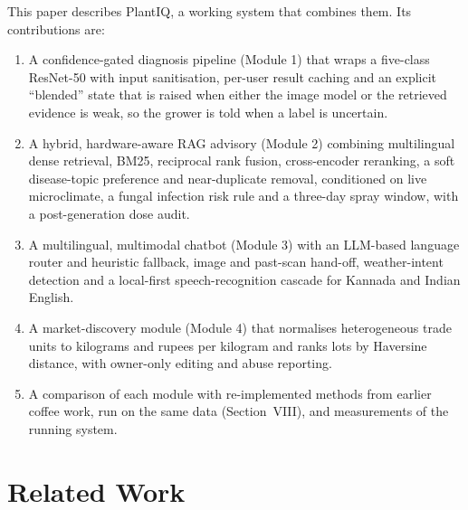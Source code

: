This paper describes PlantIQ, a working system that combines them. Its contributions are:
\begin{enumerate}
\item A confidence-gated diagnosis pipeline (Module 1) that wraps a five-class ResNet-50 with input
sanitisation, per-user result caching and an explicit ``blended'' state that is raised when either the image model or
the retrieved evidence is weak, so the grower is told when a label is uncertain.
\item A hybrid, hardware-aware RAG advisory (Module 2) combining multilingual dense retrieval, BM25, reciprocal
rank fusion, cross-encoder reranking, a soft disease-topic preference and near-duplicate removal, conditioned on live
microclimate, a fungal infection risk rule and a three-day spray window, with a post-generation dose audit.
\item A multilingual, multimodal chatbot (Module 3) with an LLM-based language router and heuristic fallback,
image and past-scan hand-off, weather-intent detection and a local-first speech-recognition cascade for Kannada and
Indian English.
\item A market-discovery module (Module 4) that normalises heterogeneous trade units to kilograms and
rupees per kilogram and ranks lots by Haversine distance, with owner-only editing and abuse reporting.
\item A comparison of each module with re-implemented methods from earlier coffee work, run on the same data
(Section~VIII), and measurements of the running system.
\end{enumerate}

\section{Related Work}
